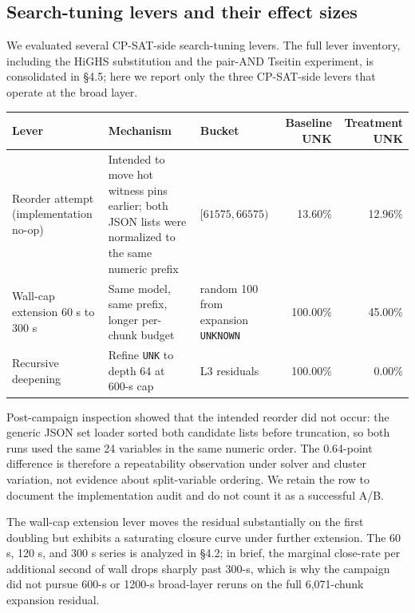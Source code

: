 \subsection{Search-tuning levers and their effect sizes}\label{search-tuning-levers-and-their-effect-sizes}

We evaluated several CP-SAT-side search-tuning levers. The
full lever inventory, including the HiGHS substitution and the
pair-AND Tseitin experiment, is consolidated in §4.5; here we report
only the three CP-SAT-side levers that operate at the broad layer.

{\def\LTcaptype{none} %
\begin{longtable}[]{@{}
  >{\raggedright\arraybackslash}p{}
  >{\raggedright\arraybackslash}p{}
  >{\raggedright\arraybackslash}p{}
  rr@{}}
\toprule\noalign{}
Lever & Mechanism & Bucket & Baseline UNK & Treatment UNK \\
\midrule\noalign{}
\endhead
\bottomrule\noalign{}
\endlastfoot
Reorder attempt (implementation no-op) & Intended to move hot witness pins earlier; both JSON lists were normalized to the same numeric prefix & $[61575, 66575)$ & 13.60\% & 12.96\% \\
Wall-cap extension 60 s to 300 s & Same model, same prefix, longer per-chunk budget & random 100 from expansion \texttt{UNKNOWN} & 100.00\% & 45.00\% \\
Recursive deepening & Refine \texttt{UNK} to depth 64 at 600-s cap & 6 L3 residuals & 100.00\% & 0.00\% \\
\end{longtable}
}

Post-campaign inspection showed that the intended reorder did not occur: the
generic JSON set loader sorted both candidate lists before truncation, so both
runs used the same 24 variables in the same numeric order. The 0.64-point
difference is therefore a repeatability observation under solver and cluster
variation, not evidence about split-variable ordering. We retain the row to
document the implementation audit and do not count it as a successful A/B.

The wall-cap extension lever moves the residual substantially on the
first doubling but exhibits a saturating closure curve under further
extension. The 60 s, 120 s, and 300 s series is analyzed in §4.2; in
brief, the marginal close-rate per additional second of wall drops
sharply past 300-s, which is why the campaign did not pursue
600-s or 1200-s broad-layer reruns on the full 6,071-chunk
expansion residual.

